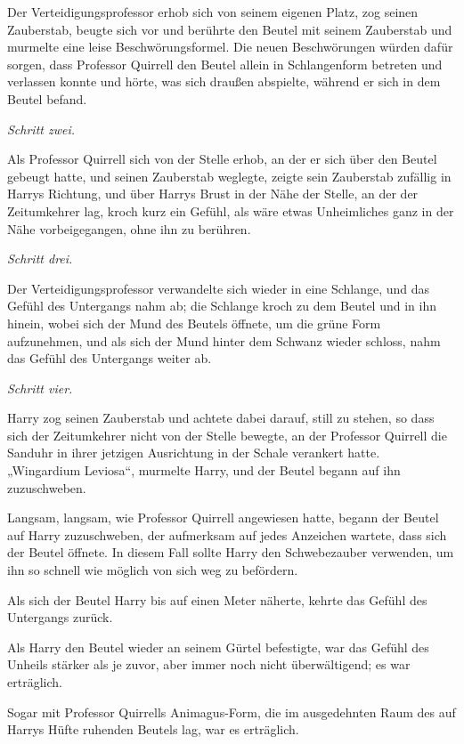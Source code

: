 {Der Verteidigungsprofessor erhob sich von seinem eigenen Platz, zog seinen Zauberstab, beugte sich vor und berührte den Beutel mit seinem Zauberstab und murmelte eine leise Beschwörungsformel. Die neuen Beschwörungen würden dafür sorgen, dass Professor Quirrell den Beutel allein in Schlangenform betreten und verlassen konnte und hörte, was sich draußen abspielte, während er sich in dem Beutel befand.

\emph{Schritt zwei.}

Als Professor Quirrell sich von der Stelle erhob, an der er sich über den Beutel gebeugt hatte, und seinen Zauberstab weglegte, zeigte sein Zauberstab zufällig in Harrys Richtung, und über Harrys Brust in der Nähe der Stelle, an der der Zeitumkehrer lag, kroch kurz ein Gefühl, als wäre etwas Unheimliches ganz in der Nähe vorbeigegangen, ohne ihn zu berühren.

\emph{Schritt drei.}

Der Verteidigungsprofessor verwandelte sich wieder in eine Schlange, und das Gefühl des Untergangs nahm ab; die Schlange kroch zu dem Beutel und in ihn hinein, wobei sich der Mund des Beutels öffnete, um die grüne Form aufzunehmen, und als sich der Mund hinter dem Schwanz wieder schloss, nahm das Gefühl des Untergangs weiter ab.

\emph{Schritt vier.}

Harry zog seinen Zauberstab und achtete dabei darauf, still zu stehen, so dass sich der Zeitumkehrer nicht von der Stelle bewegte, an der Professor Quirrell die Sanduhr in ihrer jetzigen Ausrichtung in der Schale verankert hatte. „Wingardium Leviosa“, murmelte Harry, und der Beutel begann auf ihn zuzuschweben.

Langsam, langsam, wie Professor Quirrell angewiesen hatte, begann der Beutel auf Harry zuzuschweben, der aufmerksam auf jedes Anzeichen wartete, dass sich der Beutel öffnete. In diesem Fall sollte Harry den Schwebezauber verwenden, um ihn so schnell wie möglich von sich weg zu befördern.

Als sich der Beutel Harry bis auf einen Meter näherte, kehrte das Gefühl des Untergangs zurück.

Als Harry den Beutel wieder an seinem Gürtel befestigte, war das Gefühl des Unheils stärker als je zuvor, aber immer noch nicht überwältigend; es war erträglich.

Sogar mit Professor Quirrells Animagus-Form, die im ausgedehnten Raum des auf Harrys Hüfte ruhenden Beutels lag, war es erträglich.

}
